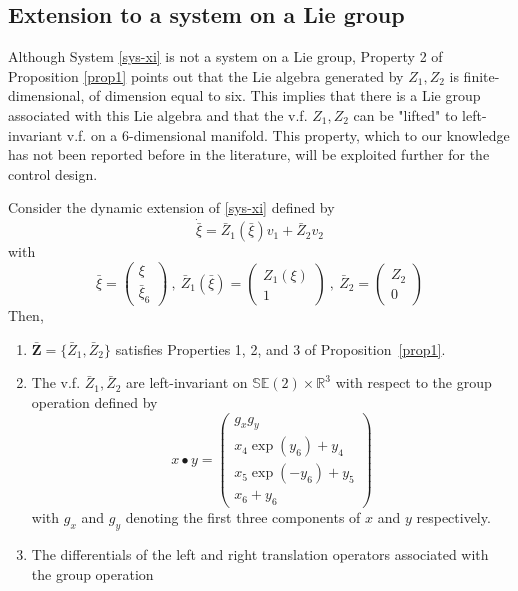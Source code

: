 \documentclass[a4paper,twoside]{article}
\def \RR {{\mathbb R}}
\def \SE {{\mathbb S}{\mathbb E}}
\begin{document}
\subsection{Extension to a system on a Lie group}
\label{extension}
Although System \eqref{sys-xi} is not a system on a Lie group, 
Property 2 of Proposition \ref{prop1} points out that the Lie algebra generated by $Z_1,Z_2$ is 
finite-dimensional, of dimension equal to six. This implies that there is a Lie group associated with this Lie 
algebra and that the v.f. $Z_1, Z_2$ can be "lifted" to left-invariant v.f. on a 
$6$-dimensional manifold. This property, which to our knowledge has not been reported before in
the literature, will be exploited further for the control design.

\begin{theorem}
\label{th1}
Consider the dynamic extension of \eqref{sys-xi} defined by
\begin{equation} \label{mod-contex}
\dot{\bar{\xi}}=\bar Z_1(\bar{\xi}) v_1+ \bar Z_2 v_2
\end{equation}
with
\[
\bar{\xi}=\begin{pmatrix} \xi \\ \bar{\xi}_6 \end{pmatrix}~,~\bar Z_1(\bar{\xi})=
\begin{pmatrix} Z_1(\xi) \\ 1 \end{pmatrix}~,~\bar Z_2=\begin{pmatrix} Z_2 \\ 0 \end{pmatrix}
\]
Then, 
\begin{enumerate}
\item $\mathbf{\bar Z}= \{\bar Z_1,\bar Z_2\}$ satisfies Properties 1, 2, and 3 of 
Proposition~\ref{prop1}.
\item The v.f. $\bar Z_1,\bar Z_2$  are left-invariant on $\SE(2) \times \RR^3$ with respect to the group operation
defined by 
\begin{equation}
\label{prod-extend}
x \bullet y = 
\begin{pmatrix}
g_x g_y \\
x_4 \exp(y_6) + y_4  \\
x_5 \exp(-y_6)+ y_5  \\
x_6 + y_6
\end{pmatrix}
\end{equation}
with $g_x$ and $g_y$ denoting the first three components of $x$ and $y$ respectively. 
\item The differentials of the left and right translation operators associated with the group operation

\end{enumerate}
\end{theorem}
\end{document}
